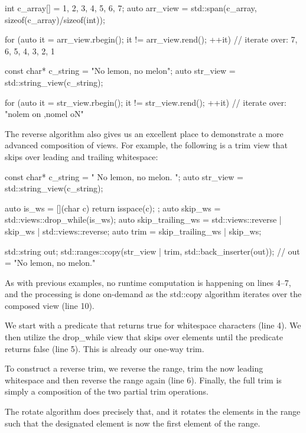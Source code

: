 \begin{box-note}
\begin{cppcode}
int c_array[] = {1, 2, 3, 4, 5, 6, 7};
auto arr_view = std::span(c_array, sizeof(c_array)/sizeof(int));

for (auto it = arr_view.rbegin(); it != arr_view.rend(); ++it) {
    // iterate over: {7, 6, 5, 4, 3, 2, 1}
}

const char* c_string = "No lemon, no melon";
auto str_view = std::string_view(c_string);

for (auto it = str_view.rbegin(); it != str_view.rend(); ++it) {
    // iterate over: "nolem on ,nomel oN"
}
\end{cppcode}
\end{box-note}

The reverse algorithm also gives us an excellent place to demonstrate a more advanced composition of views. For example, the following is a trim view that skips over leading and trailing whitespace:

\begin{box-note}
\begin{cppcode}
const char* c_string = "  No lemon, no melon.     ";
auto str_view = std::string_view(c_string);

auto is_ws = [](char c) { return isspace(c); };
auto skip_ws = std::views::drop_while(is_ws);
auto skip_trailing_ws = std::views::reverse | skip_ws | std::views::reverse;
auto trim = skip_trailing_ws | skip_ws;

std::string out;
std::ranges::copy(str_view | trim, std::back_inserter(out));
// out = "No lemon, no melon."
\end{cppcode}
\end{box-note}

As with previous examples, no runtime computation is happening on lines 4–7, and the processing is done on-demand as the std::copy algorithm iterates over the composed view (line 10).

We start with a predicate that returns true for whitespace characters (line 4). We then utilize the drop\_while view that skips over elements until the predicate returns false (line 5). This is already our one-way trim.

To construct a reverse trim, we reverse the range, trim the now leading whitespace and then reverse the range again (line 6). Finally, the full trim is simply a composition of the two partial trim operations.

The rotate algorithm does precisely that, and it rotates the elements in the range such that the designated element is now the first element of the range.

